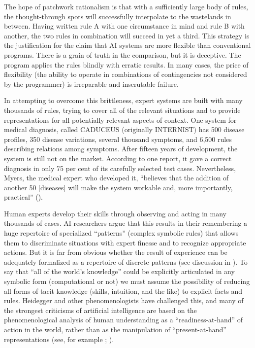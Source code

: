 \documentclass[12pt]{article}
\begin{document}
The hope of patchwork rationalism is that with a sufficiently large body of rules, the thought-through spots will successfully interpolate to the wastelands in between. Having written rule A with one circumstance in mind and rule B with another, the two rules in combination will succeed in yet a third. This strategy is the justification for the claim that AI systems are more flexible than conventional programs. There is a grain of truth in the comparison, but it is deceptive. The program applies the rules blindly with erratic results. In many cases, the price of flexibility (the ability to operate in combinations of contingencies not considered by the programmer) is irreparable and inscrutable failure.

In attempting to overcome this brittleness, expert systems are built with many thousands of rules, trying to cover all of the relevant situations and to provide representations for all potentially relevant aspects of context. One system for medical diagnosis, called CADUCEUS (originally INTERNIST) has 500 disease profiles, 350 disease variations, several thousand symptoms, and 6,500 rules describing relations among symptoms. After fifteen years of development, the system is still not on the market. According to one report, it gave a correct diagnosis in only 75 per cent of its carefully selected test cases. Nevertheless, Myers, the medical expert who developed it, ``believes that the addition of another 50 [diseases] will make the system workable and, more importantly, practical'' (\cite{newquist1987}).

Human experts develop their skills through observing and acting in many
thousands of cases. AI researchers argue that this results in their remembering a huge repertoire of specialized ``patterns'' (complex symbolic rules) that allows them to discriminate situations with expert finesse and to recognize appropriate actions. But it is far from obvious whether the result of experience can be adequately formalized as a repertoire of discrete patterns (see discussion in \cite{dreyfus1986}). To say that ``all of the world's knowledge'' could be explicitly articulated in any symbolic form (computational or not) we must assume the possibility of reducing all forms of tacit knowledge (skills, intuition, and the like) to explicit facts and rules. Heidegger and other phenomenologists have challenged this, and many of the strongest criticisms of artificial intelligence are based on the phenomenological analysis of human understanding as a ``readiness-at-hand'' of action in the world, rather than as the manipulation of ``present-at-hand'' representations (see, for example \cite{dreyfus1979}; \cite{winograd-flores-1986}).
\end{document}
